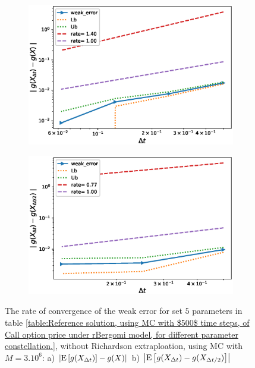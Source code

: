 \documentclass[11pt]{article}
\newcommand{\expt}[1]{\mathrm{E}\left[#1\right]}
\begin{document}
\begin{figure}[!htb]
	\centering
	\begin{subfigure}{.4\textwidth}
		\centering
		\includegraphics[width=1\linewidth]{./figures/rBergomi_weak_error_rates/without_richardson/H_002/weak_convergence_order_Bergomi_H_002_K_1_M_3_10_6_CI_relative}
		\caption{}
		\label{fig:sub3}
	\end{subfigure}%
	\begin{subfigure}{.4\textwidth}
		\centering
		\includegraphics[width=1\linewidth]{./figures/rBergomi_weak_error_rates/without_richardson/H_002/weak_convergence_order_differences_Bergomi_H_002_K_1_M_3_10_6_CI_relative}
		\caption{}
		\label{fig:sub4}
	\end{subfigure}
	
	\caption{The rate of convergence of the weak error for set $5$ parameters in table \ref{table:Reference solution, using MC with $500$ time steps, of Call option price under rBergomi model, for different parameter constellation.}, without Richardson extraploation, using MC with $M=3.10^6$: a) $\abs{\expt{g(X_{\Delta t})}-g(X)}$  b) $\abs{\expt{g(X_{\Delta t})-g(X_{\Delta t/2})}}$ }
	\label{fig:Weak_rate_H_002_without_rich_K_1}
\end{figure}
\end{document}
